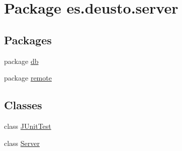 \hypertarget{namespacees_1_1deusto_1_1server}{}\section{Package es.\+deusto.\+server}
\label{namespacees_1_1deusto_1_1server}
\subsection*{Packages}
\begin{DoxyCompactItemize}
\item 
package \hyperlink{namespacees_1_1deusto_1_1server_1_1db}{db}
\item 
package \hyperlink{namespacees_1_1deusto_1_1server_1_1remote}{remote}
\end{DoxyCompactItemize}
\subsection*{Classes}
\begin{DoxyCompactItemize}
\item 
class \hyperlink{classes_1_1deusto_1_1server_1_1_j_unit_test}{J\+Unit\+Test}
\item 
class \hyperlink{classes_1_1deusto_1_1server_1_1_server}{Server}
\end{DoxyCompactItemize}
